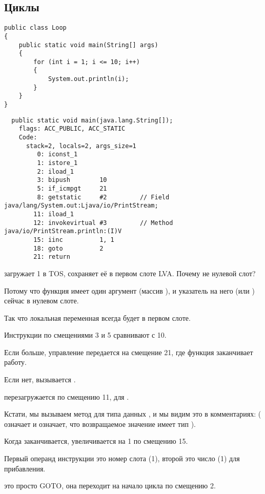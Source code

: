 \subsection{Циклы}

\begin{lstlisting}
public class Loop
{
	public static void main(String[] args)
	{ 
		for (int i = 1; i <= 10; i++)
		{
			System.out.println(i); 
		}               
	}
}
\end{lstlisting}

\begin{lstlisting}
  public static void main(java.lang.String[]);
    flags: ACC_PUBLIC, ACC_STATIC
    Code:
      stack=2, locals=2, args_size=1
         0: iconst_1      
         1: istore_1      
         2: iload_1       
         3: bipush        10
         5: if_icmpgt     21
         8: getstatic     #2         // Field java/lang/System.out:Ljava/io/PrintStream;
        11: iload_1       
        12: invokevirtual #3         // Method java/io/PrintStream.println:(I)V
        15: iinc          1, 1
        18: goto          2
        21: return        
\end{lstlisting}


 загружает 1 в \ac{TOS},  сохраняет её в первом слоте \ac{LVA}.
Почему не нулевой слот?

Потому что функция \main имеет один аргумент (массив ),
и указатель на него (или ) сейчас в нулевом слоте.


Так что локальная переменная  всегда будет в первом слоте.


Инструкции по смещениями 3 и 5 сравнивают  с 10.

Если  больше, управление передается на смещение 21, где функция заканчивает работу.

Если нет, вызывается .

 перезагружается по смещению 11, для .

Кстати, мы вызываем метод  для типа данных , 
и мы видим это в комментариях: 
( означает  и  означает, что возвращаемое значение имеет тип ).


Когда  заканчивается,  увеличивается на 1 по смещению 15.

Первый операнд инструкции это номер слота (1), 
второй это число (1) для прибавления.


 это просто GOTO, она переходит на начало цикла по смещению 2.


